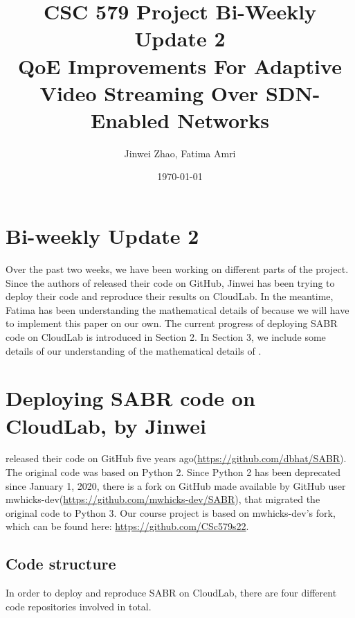 \documentclass{article}
\begin{document}
\title{\textbf{CSC 579 Project Bi-Weekly Update 2 \protect\\ QoE Improvements For Adaptive Video Streaming Over SDN-Enabled Networks}}

\author{Jinwei Zhao, Fatima Amri}

\date{\today}

\maketitle

\section{Bi-weekly Update 2}
Over the past two weeks, we have been working on different parts of the project.
Since the authors of \cite{bhat_network_2017} released their code on GitHub, Jinwei has been trying to deploy their code and reproduce their results on CloudLab. In the meantime, Fatima has been understanding the mathematical details of \cite{mu_scalable_2016} because we will have to implement this paper on our own. The current progress of deploying SABR code \cite{bhat_network_2017} on CloudLab is introduced in Section 2. In Section 3, we include some details of our understanding of the mathematical details of \cite{mu_scalable_2016}. 

\section{Deploying SABR code on CloudLab, by Jinwei}

\cite{bhat_network_2017} released their code on GitHub five years ago(\url{https://github.com/dbhat/SABR}). The original code was based on Python 2. Since Python 2 has been deprecated since January 1, 2020, there is a fork on GitHub made available by GitHub user mwhicks-dev(\url{https://github.com/mwhicks-dev/SABR}), that migrated the original code to Python 3. Our course project is based on mwhicks-dev's fork, which can be found here: \url{https://github.com/CSc579s22}. 

\subsection{Code structure}

In order to deploy and reproduce SABR on CloudLab, there are four different code repositories involved in total. 
\end{document}
